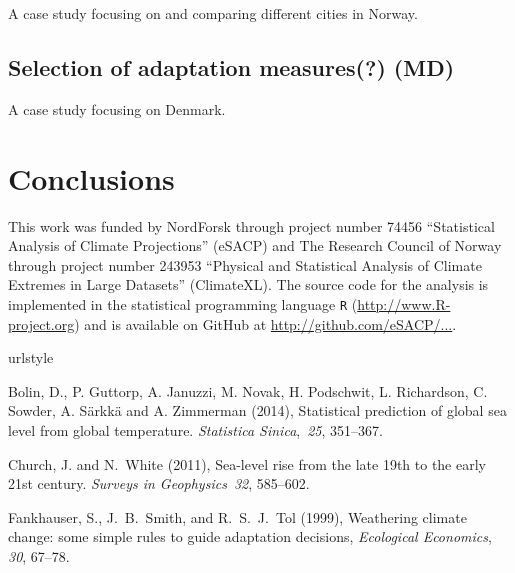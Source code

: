 \documentclass[wrr, draft]{agutex}
\begin{document}
\begin{article}
A case study focusing on and comparing different cities in Norway.

\subsection{Selection of adaptation measures(?) {\color{blue} (MD)}}

A case study focusing on Denmark. 

\section{Conclusions}

\begin{acknowledgments}
This work was funded by NordForsk through project number 74456 ``Statistical Analysis of Climate Projections'' (eSACP) and The Research Council of Norway through project number 243953 ``Physical and Statistical Analysis of Climate Extremes in Large Datasets'' (ClimateXL). The source code for the analysis is implemented in the statistical programming language {\tt R} (\url{http://www.R-project.org}) and is available on GitHub at \url{http://github.com/eSACP/...}.
\end{acknowledgments}


% 

\begin{thebibliography}{37}
\providecommand{\natexlab}[1]{#1}
\expandafter\ifx\csname urlstyle\endcsname\relax
  \providecommand{\doi}[1]{doi:\discretionary{}{}{}#1}\else
  \providecommand{\doi}{doi:\discretionary{}{}{}\begingroup
  \urlstyle{rm}\Url}\fi

Bolin, D., P. Guttorp, A. Januzzi, M. Novak, H. Podschwit, L. Richardson, C. Sowder, A. S\"{a}rkk\"{a} and A. Zimmerman (2014), Statistical prediction of global sea level from
  global temperature. \textit{Statistica Sinica},~{\em25}, 351--367.
  
Church, J. and N.~White (2011),
Sea-level rise from the late 19th to the early 21st century.
{\em Surveys in Geophysics\/}~{\em 32}, 585--602.

  Fankhauser, S., J.~B.~Smith, and R.~S.~J.~Tol (1999), {Weathering climate
    change: some simple rules to guide adaptation decisions},
  \textit{Ecological Economics}, \textit{30}, 67--78.
  

\end{thebibliography}
\end{article}
\end{document}
